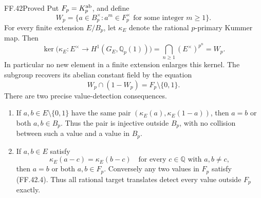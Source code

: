 \begin{claim}{FF.42}{Proved}\label{clm:FFmetabeliankernel}
Put \(F_p=K_p^{\rm ab}\), and define
\[
 W_p=\{a\in B_p^\times:
                  a^m\in F_p^\times
                  \text{ for some integer }m\ge1\}.
                                                        \tag{FF.42.1}
\]
For every finite extension \(E/B_p\),
let \(\kappa_E\) denote the rational
\(p\)-primary Kummer map. Then
\[
 \ker\bigl(\kappa_E:E^\times
             \longrightarrow H^1(G_E,\mathbb Q_p(1))\bigr)
       =\bigcap_{n\ge1}(E^\times)^{p^n}=W_p.
                                                        \tag{FF.42.2}
\]
In particular no new element in a
finite extension enlarges this kernel.
The subgroup recovers its abelian
constant field by the equation
\[
                     W_p\cap(1-W_p)=F_p\setminus\{0,1\}.
                                                        \tag{FF.42.3}
\]
There are two precise value-detection
consequences.
\begin{enumerate}
\item If \(a,b\in E\setminus\{0,1\}\)
have the same pair
\((\kappa_E(a),\kappa_E(1-a))\),
then \(a=b\) or both \(a,b\in B_p\).
Thus the pair is injective outside
\(B_p\), with no collision between
such a value and a value in \(B_p\).
\item If \(a,b\in E\) satisfy
\[
                  \kappa_E(a-c)=\kappa_E(b-c)
                  \quad\text{for every }c\in\mathbb Q
                  \text{ with }a,b\ne c,
                                                        \tag{FF.42.4}
\]
then \(a=b\) or both \(a,b\in F_p\).
Conversely any two values in \(F_p\)
satisfy (FF.42.4). Thus all rational
target translates detect every value
outside \(F_p\) exactly.
\end{enumerate}
\end{claim}
